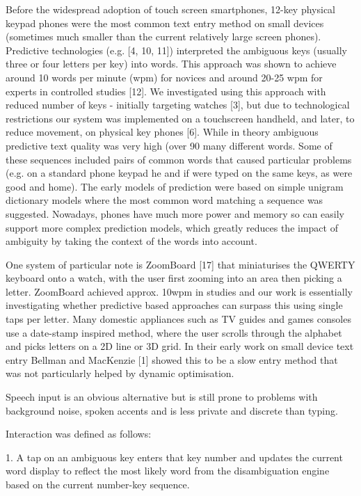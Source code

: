 \documentclass{article}
\begin{document}
Before the widespread adoption of touch screen
smartphones, 12-key physical keypad phones were the
most common text entry method on small devices
(sometimes much smaller than the current relatively
large screen phones). Predictive technologies (e.g. [4,
10, 11]) interpreted the ambiguous keys (usually three
or four letters per key) into words. This approach was
shown to achieve around 10 words per minute (wpm) for
novices and around 20-25 wpm for experts in controlled
studies [12]. We investigated using this approach with
reduced number of keys - initially targeting watches [3],
but due to technological restrictions our system was
implemented on a touchscreen handheld, and later, to
reduce movement, on physical key phones [6]. While in
theory ambiguous predictive text quality was very high
(over 90%
many different words. Some of these sequences included
pairs of common words that caused particular problems
(e.g. on a standard phone keypad he and if were typed
on the same keys, as were good and home). The early
models of prediction were based on simple unigram
dictionary models where the most common word
matching a sequence was suggested. Nowadays, phones
have much more power and memory so can easily
support more complex prediction models, which greatly
reduces the impact of ambiguity by taking the context of
the words into account.

One system of particular note is ZoomBoard [17] that
miniaturises the QWERTY keyboard onto a watch, with
the user first zooming into an area then picking a letter.
ZoomBoard achieved approx. 10wpm in studies and our
work is essentially investigating whether predictive
based approaches can surpass this using single taps per
letter. Many domestic appliances such as TV guides and
games consoles use a date-stamp inspired method,
where the user scrolls through the alphabet and picks
letters on a 2D line or 3D grid. In their early work on
small device text entry Bellman and MacKenzie [1]
showed this to be a slow entry method that was not
particularly helped by dynamic optimisation. 

Speech input is an obvious alternative but is still prone
to problems with background noise, spoken accents and
is less private and discrete than typing.  

Interaction was defined as follows:

1. A tap on an ambiguous key enters that key number and updates the current word display to reflect the most likely word from the disambiguation engine based on the current number-key sequence. 
\end{document}
